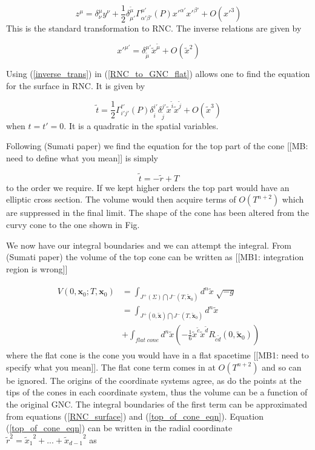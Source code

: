 \documentclass[12pt]{article}
\newcommand{\be}{\begin{equation}}
\newcommand{\ee}{\end{equation}}
\begin{document}
\be\label{RNC_to_GNC_flat}
z^\mu=\delta^\mu_\nu y^\nu+\frac{1}{2}\delta^{\tilde{\mu}}_{\mu '}\Gamma^{\mu '}_{\alpha '\beta '}(P)x'^{\alpha '}x'^{\beta '}+O(x'^3)
\ee
This is the standard transformation to RNC. The inverse relations are given by

\be\label{inverse_trans}
x'^{\mu '}=\delta^{\mu '}_{\tilde{\mu}}\tilde{x}^{\tilde{\mu}}+O(\tilde{x}^2)
\ee

Using (\ref{inverse_trans}) in (\ref{RNC_to_GNC_flat})
 allows one to find the equation for the surface in RNC. It is given by

\be\label{RNC_surface}
\tilde{t}=\frac{1}{2}\Gamma^{t'}_{i'j'}(P)\delta^{i'}_{\tilde{i}}\delta^{j'}_{\tilde{j}}
\tilde{x}^{\tilde{i}}\tilde{x}^{\tilde{j}}+O(\tilde{x}^3)
\ee
when $t=t'=0$. It is a quadratic in the spatial variables.

Following (Sumati paper) we find the equation for the top part of the cone [[MB: need to define what you mean]] is simply

\be\label{top_of_cone_eqn}
\tilde{t}=-\tilde{r}+T
\ee
to the order we require. If we kept higher orders the top part would have an elliptic cross section. The volume would then acquire terms of $O(T^{n+2})$ which are suppressed in the final limit. The shape of the cone has been altered from the curvy cone to the one shown in Fig.

We now have our integral boundaries and we can attempt the integral. From (Sumati paper) the volume of the top cone can be written as [[MB1: integration region is wrong]]

\begin{gather}\label{volume_from_sumati}
\begin{aligned}
V(0,\mathbf{x}_0;T,\mathbf{x}_0) & =\int_{J^{+}(\Sigma)\bigcap J^{-}(T,\mathbf{\tilde{x}}_0)}d^n\tilde{x}\;  \sqrt{-g} \\
& =\int_{J^{+}(0,\mathbf{\tilde{x}})\bigcap J^{-}(T,\mathbf{\tilde{x}}_0)}d^n\tilde{x}\;\\
 & +\int_{flat\;cone}d^n\tilde{x}\left(-\frac{1}{6}\tilde{x}^{\tilde{c}}\tilde{x}^{\tilde{d}}
R_{\tilde{c}\tilde{d}}(0,\mathbf{\tilde{x}}_0)\right)
\end{aligned}
\end{gather}
where the flat cone is the cone you would have in a flat spacetime [[MB1: need to specify what you mean]]. The flat cone term comes in at $O(T^{n+2})$ and so can be ignored. The origins of the coordinate systems agree, as do the points at the tips of the cones in each coordinate system, thus the volume can be a function of the original GNC. The integral boundaries of the first term can be approximated from equations (\ref{RNC_surface}) and (\ref{top_of_cone_eqn}). Equation (\ref{top_of_cone_eqn}) can be written in the radial coordinate $\tilde{r}^2={\tilde{x}_{1}}^2+...+{\tilde{x}_{d-1}}^2$ as
\end{document}

